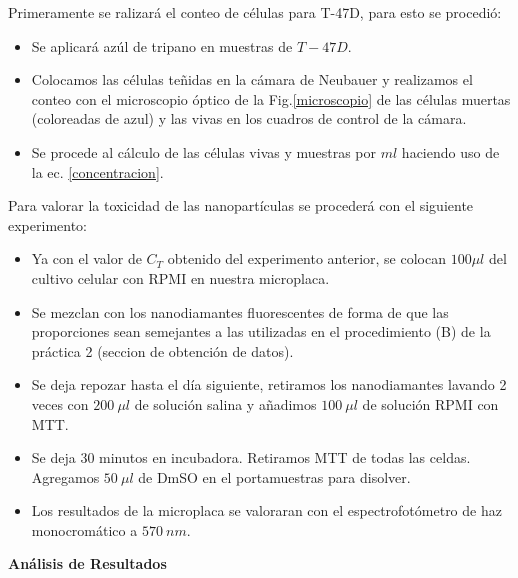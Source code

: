 Primeramente se ralizará el conteo de células para T-47D, para esto se procedió:\\[-1cm]
\begin{itemize}
    \item Se aplicará azúl de tripano en muestras de $T-47D$.
    \item Colocamos las células teñidas en la cámara de Neubauer y realizamos el conteo con el microscopio óptico de la Fig.\ref{microscopio} de las células muertas (coloreadas de azul) y las vivas en los cuadros de control de la cámara.
    \item Se procede al cálculo de las células vivas y muestras por $ml$ haciendo uso de la ec. \ref{concentracion}. 
\end{itemize}

Para valorar la toxicidad de las nanopartículas se procederá con el siguiente experimento:\\[-1cm]
\begin{itemize}
    \item Ya con el valor de $C_T$ obtenido del experimento anterior, se colocan $100\mu l$ del cultivo celular con RPMI en nuestra microplaca.
    \item Se mezclan con los nanodiamantes fluorescentes de forma de que las proporciones sean semejantes a las utilizadas en el procedimiento (B) de la práctica 2 (seccion de obtención de datos).
    \item Se deja repozar hasta el día siguiente, retiramos los nanodiamantes lavando 2 veces con $200~\mu l$ de solución salina y añadimos $100~ \mu l$ de solución RPMI con MTT.
    \item Se deja 30 minutos en incubadora. Retiramos MTT de todas las celdas. Agregamos $50 ~\mu l$ de DmSO en el portamuestras para disolver.
    \item Los resultados de la microplaca se valoraran con el espectrofotómetro de haz monocromático a $570~ nm$.
\end{itemize}

\textbf{\textcolor{azul50}{Análisis de Resultados}}

